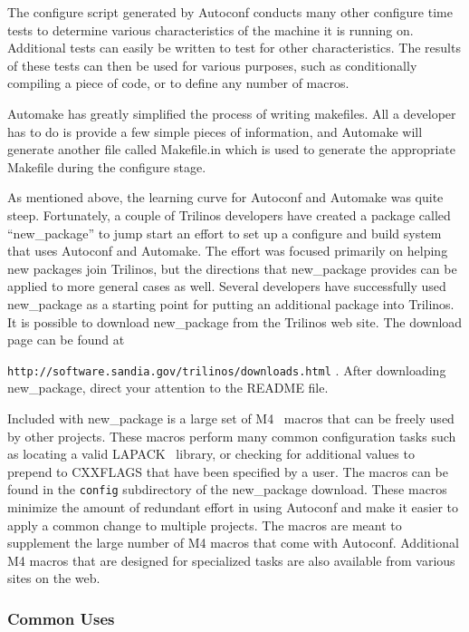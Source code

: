\documentclass[12pt,relax]{article}
\newcommand{\InlineDirectory}[1]{
  {\hspace{0.01 in}} {\tt #1} {\hspace{0.01 in}}}
\begin{document}
The configure script generated by Autoconf conducts many other configure 
time tests to determine various 
characteristics of the machine it is running on.  Additional tests can 
easily be written to test for other characteristics.  The results of these 
tests can then be used for various purposes, such as conditionally compiling 
a piece of code, or to define any number of macros.

Automake has greatly simplified the process of writing makefiles.  All a 
developer has to do is provide a few simple pieces of information, and 
Automake will generate another file called Makefile.in which is used to 
generate the appropriate Makefile during the configure stage.

As mentioned above, the learning curve for Autoconf and Automake was quite 
steep.  Fortunately, a couple of Trilinos developers have created a package 
called ``new\_package'' to jump start an effort to set up a configure and 
build system that uses Autoconf and Automake.  The effort was focused 
primarily on helping new packages join Trilinos, but the directions that 
new\_package provides can be applied to more general cases as well.  Several
developers have successfully used new\_package as a starting point for 
putting an additional
package into Trilinos.  It is possible to download new\_package from the 
Trilinos web site.  The download page can be found at \newline 
\InlineDirectory{http://software.sandia.gov/trilinos/downloads.html}.  After
downloading new\_package, direct your attention to the README file.

Included with new\_package is a large set of M4~\cite{M4} macros that can 
be freely used by other projects.  These macros perform many common 
configuration tasks such as locating a valid LAPACK~\cite{lapack} library, 
or checking for additional values to prepend to CXXFLAGS that have been 
specified by a user.  The macros can be found in the \InlineDirectory{config}
subdirectory of the new\_package download.  These macros minimize the amount of
redundant effort in using Autoconf and make it easier to apply a common change 
to multiple projects.  The macros are meant to supplement the large number of 
M4 macros that come with Autoconf.  Additional M4 macros that are designed for 
specialized tasks are also available from various sites on the web.

\subsubsection{Common Uses}
\end{document}
